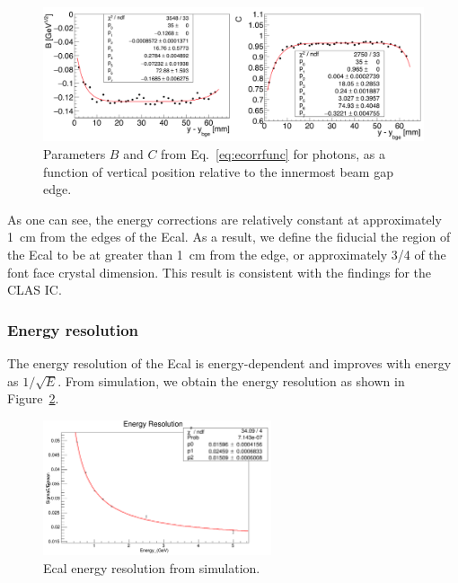 \begin{figure}[H]
  \centering
      \includegraphics[width=1.0\textwidth]{pics/performance/sfparEdge_p.png}
  \caption[Ecal energy shower parameters for photons relative to the inside beam gap edge]{Parameters $B$ and $C$ from Eq.~\ref{eq:ecorrfunc} for photons, as a function of vertical position
relative to the innermost beam gap edge.}
  \label{Figure:sfparEdgeP}
\end{figure}

As one can see, the energy corrections are relatively constant at approximately 1~cm from the edges of the Ecal. As a result, we define the fiducial the region of the Ecal to be at greater than 1~cm from the edge, or approximately 3/4 of the font face crystal dimension. This result is consistent with the findings for the CLAS IC. 

\subsubsection{Energy resolution}

The energy resolution of the Ecal is energy-dependent and improves with energy as $1/\sqrt{E}$. From simulation, we obtain the energy resolution as shown in Figure~\ref{Figure:eResFitMC}.

\begin{figure}[H]
  \centering
      \includegraphics[width=0.6\textwidth]{pics/performance/eResFitMC.png}
  \caption[Ecal energy resolution fitted from simulation]{Ecal energy resolution from simulation.}
  \label{Figure:eResFitMC}
\end{figure}

